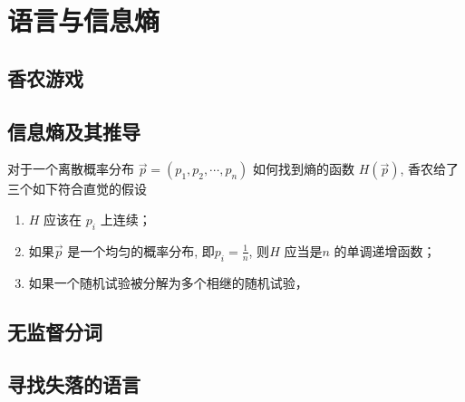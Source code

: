 %
\chapter{语言与信息熵}

\section{香农游戏}

\section{信息熵及其推导}

对于一个离散概率分布 $\vec{p} = (p_1, p_2, \cdots, p_n)$ 如何找到熵的函数
$H(\vec{p})$, 香农给了三个如下符合直觉的假设
\begin{enumerate}

\item $H$ 应该在 $p_i$ 上连续；
\item 如果$\vec{p}$ 是一个均匀的概率分布, 即$p_i = \frac{1}{n}$, 则$H$ 应当是$n$ 的单调递增函数； 
\item 如果一个随机试验被分解为多个相继的随机试验，

\end{enumerate}

\section{无监督分词}

\section{寻找失落的语言}

